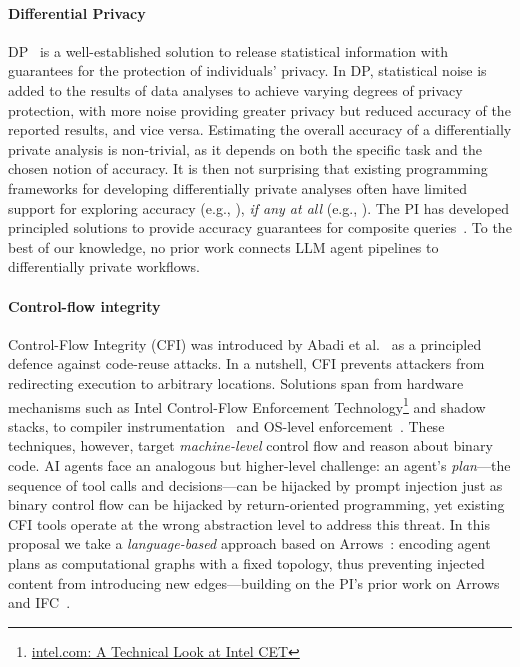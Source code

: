 \documentclass{kaw}
\begin{document}
\paragraph{Differential Privacy}
DP~\cite{Dwork:2006} is a well-established solution to
release statistical information with guarantees for
the protection of individuals' privacy.
%
In DP, statistical noise is added to the results of data analyses to achieve
varying degrees of privacy protection, with more noise providing greater privacy
but reduced accuracy of the reported results, and vice versa.
%
%
Estimating the overall accuracy of a differentially private analysis is
non-trivial, as it depends on both the specific task and the chosen notion of
accuracy.
%
It is then not surprising that existing programming frameworks for developing
differentially private analyses often have limited support for exploring
accuracy (e.g., \cite{Apex,DBLP:journals/corr/GaboardiHKNUV16}), \emph{if any
  at all} (e.g., \cite{PINQ09,ZhangMKHMM18,JohnsonNS18}).
%
The PI has developed principled solutions to provide accuracy guarantees
for composite queries~\cite{LoboVesga:SP20,LoboVesga:TOPLAS21,Russo:CCS25}.
%
To the best of our knowledge, no prior work connects LLM agent pipelines to
differentially private workflows. 

\paragraph{Control-flow integrity}
Control-Flow Integrity (CFI) was introduced by Abadi et
al.~\cite{Abadi:CFI:CCS05} as a principled defence against code-reuse
attacks. 
In a nutshell, CFI prevents attackers from redirecting execution to arbitrary locations.
%
Solutions span from hardware mechanisms such as Intel
Control-Flow Enforcement Technology\footnote{\href{https://www.intel.com/content/www/us/en/developer/articles/technical/technical-look-control-flow-enforcement-technology.html}{intel.com: A Technical Look at Intel CET}} and shadow
stacks, to compiler instrumentation~\cite{Tice:CompilerCFI:USENIX14} and
OS-level enforcement~\cite{Burow:CFI:CSUR17}. 
%
These techniques, however, target \emph{machine-level} control flow and
reason about binary code.
%
AI agents face an analogous but higher-level challenge: an agent's
\emph{plan}---the sequence of tool calls and decisions---can be hijacked by
prompt injection just as binary control flow can be hijacked by
return-oriented programming, yet existing CFI tools operate at the wrong
abstraction level to address this threat.
%
In this proposal we take a \emph{language-based} approach based on Arrows~\cite{hughes:generalising-monads-arrows}: encoding agent
plans as computational graphs with a fixed topology, thus 
preventing injected content from introducing new
edges---building on the PI's prior work on
Arrows  
and IFC~\cite{Tsai:Russo:Hughes:CSF07}.
\end{document}
